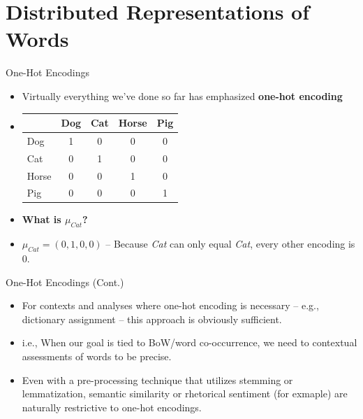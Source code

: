 \documentclass[
  ignorenonframetext,
  aspectratio=169]{beamer}
\begin{document}
\section{Distributed Representations of
Words}\label{distributed-representations-of-words}

\begin{frame}{One-Hot Encodings}
\label{one-hot-encodings}
\begin{itemize}
\item Virtually everything we've done so far has emphasized \textbf{one-hot encoding} \par \vspace{2.5mm} \pause
\item[] \begin{tabular}{lcccc}
\toprule
 & Dog & Cat & Horse & Pig \\
\midrule
Dog   & 1 & 0 & 0 & 0 \\
Cat   & 0 & 1 & 0 & 0 \\
Horse & 0 & 0 & 1 & 0 \\
Pig   & 0 & 0 & 0 & 1 \\
\bottomrule
\end{tabular} \par \vspace{2.5mm}
\item \textbf{What is $\mu_{Cat}$?} \par \vspace{2.5mm} \pause
\item $\mu_{Cat} = (0, 1, 0, 0)$ -- Because \textit{Cat} can only equal \textit{Cat}, every other encoding is 0. 
\end{itemize}
\end{frame}

\begin{frame}{One-Hot Encodings (Cont.)}
\label{one-hot-encodings-cont.}
\begin{itemize}
\item For contexts and analyses where one-hot encoding is necessary -- e.g., dictionary assignment -- this approach is obviously sufficient.  \par \vspace{2.5mm}
\item i.e., When our goal is tied to BoW/word co-occurrence, we need to contextual assessments of words to be precise.  \par \vspace{2.5mm}
\item Even with a pre-processing technique that utilizes stemming or lemmatization, semantic similarity or rhetorical sentiment (for exmaple) are naturally restrictive to one-hot encodings. \par \vspace{2.5mm}
\end{itemize}
\end{frame}
\end{document}
